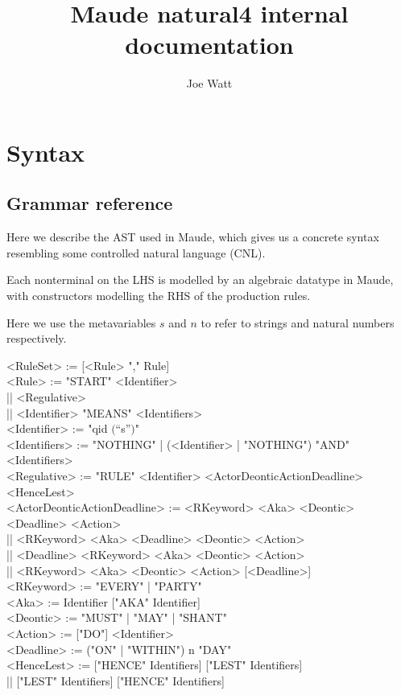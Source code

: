 \documentclass{article}
\title{Maude natural4 internal documentation}
\author{Joe Watt}
\begin{document}
\maketitle


\tableofcontents

\newpage

\section{Syntax}

\subsection{Grammar reference}
Here we describe the AST used in Maude, which gives us a concrete syntax
resembling some controlled natural language (CNL).

Each nonterminal on the LHS is modelled by an algebraic datatype in Maude, with
constructors modelling the RHS of the production rules.

Here we use the metavariables $s$ and $n$ to refer to strings and
natural numbers respectively.

\begin{ebnf}
  <RuleSet> := [{<Rule> ","} Rule] \\
  <Rule> := "START" <Identifier> \\
    || <Regulative> \\
    || <Identifier> "MEANS" <Identifiers>
  \\
  <Identifier> := "qid $\lparen$``s''$\rparen$"
  \\
  <Identifiers> := "NOTHING" | {(<Identifier> | "NOTHING") "AND"} <Identifiers>
  \\
  <Regulative> :=
    "RULE" <Identifier>
    <ActorDeonticActionDeadline>
    <HenceLest>
  \\
  <ActorDeonticActionDeadline> :=
    <RKeyword> <Aka> <Deontic> <Deadline> <Action> \\
    || <RKeyword> <Aka> <Deadline> <Deontic> <Action> \\
    || <Deadline> <RKeyword> <Aka> <Deontic> <Action> \\
    || <RKeyword> <Aka> <Deontic> <Action> [<Deadline>]
  \\
  <RKeyword> := "EVERY" | "PARTY"
  \\
  <Aka> := Identifier ["AKA" Identifier]
  \\
  <Deontic> := "MUST" | "MAY" | "SHANT"
  \\
  <Action> := ["DO"] <Identifier>
  \\
  <Deadline> := ("ON" | "WITHIN") n "DAY"
  \\
  <HenceLest> := ["HENCE" Identifiers] ["LEST" Identifiers] \\
    || ["LEST" Identifiers] ["HENCE" Identifiers]
\end{ebnf}
\end{document}
